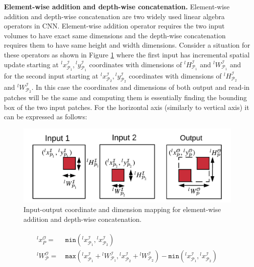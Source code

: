 \vspace{2mm}
\noindent \textbf{Element-wise addition and depth-wise concatenation.}
Element-wise addition and depth-wise concatenation are two widely used linear algebra operators in CNN.
Element-wise addition operator requires the two input volumes to have exact same dimensions and the depth-wise concatenation requires them to have same height and width dimensions.
Consider a situation for these operators as shown in Figure \ref{fig:la_operators} where the first input has incremental spatial update starting at ${}^lx^\mathcal{I}_{\mathcal{P}_1},{}^ly^\mathcal{I}_{\mathcal{P}_1}$ coordinates with dimensions of ${}^lH^\mathcal{I}_{\mathcal{P}_1}$ and ${}^lW^\mathcal{I}_{\mathcal{P}_1}$ and for the second input starting at ${}^lx^\mathcal{I}_{\mathcal{P}_2},{}^ly^\mathcal{I}_{\mathcal{P}_2}$ coordinates with dimensions of ${}^lH^\mathcal{I}_{\mathcal{P}_2}$ and ${}^lW^\mathcal{I}_{\mathcal{P}_2}$.
In this case the coordinates and dimensions of both output and read-in patches will be the same and computing them is essentially finding the bounding box of the two input patches.
For the horizontal axis (similarly to vertical axis) it can be expressed as follows:


\begin{figure}[t]
\includegraphics[width=\columnwidth]{images/la_operators}
\caption{Input-output coordinate and dimension mapping for element-wise addition and depth-wise concatenation.}
\label{fig:la_operators}
\end{figure}

\begin{align}
\begin{split}
{}^lx^\mathcal{O}_P =&~ \texttt{min}({}^lx^\mathcal{I}_{\mathcal{P}_1},{}^lx^\mathcal{I}_{\mathcal{P}_2})\\
{}^lW^\mathcal{O}_\mathcal{P} =&~ \texttt{max}({}^lx^\mathcal{I}_{\mathcal{P}_1}+{}^lW^\mathcal{I}_{\mathcal{P}_1},{}^lx^\mathcal{I}_{\mathcal{P}_2}+{}^lW^\mathcal{I}_{\mathcal{P}_2}) -\texttt{min}({}^lx^\mathcal{I}_{\mathcal{P}_1},{}^lx^\mathcal{I}_{\mathcal{P}_2})
\end{split}
\end{align}


